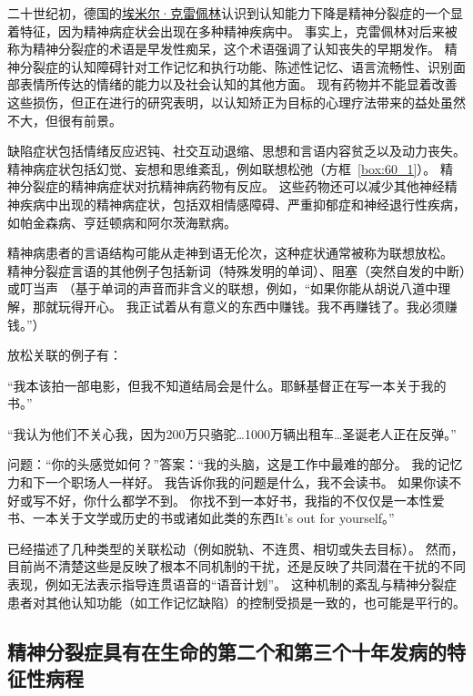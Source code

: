 二十世纪初，德国的\href{https://baike.baidu.com/item/%E5%9F%83%E7%B1%B3%E5%B0%94%C2%B7%E5%85%8B%E9%9B%B7%E4%BD%A9%E6%9E%97/6486796}{埃米尔·克雷佩林}认识到认知能力下降是精神分裂症的一个显着特征，因为精神病症状会出现在多种精神疾病中。
事实上，克雷佩林对后来被称为精神分裂症的术语是早发性痴呆，这个术语强调了认知丧失的早期发作。
精神分裂症的认知障碍针对工作记忆和执行功能、陈述性记忆、语言流畅性、识别面部表情所传达的情绪的能力以及社会认知的其他方面。
现有药物并不能显着改善这些损伤，但正在进行的研究表明，以认知矫正为目标的心理疗法带来的益处虽然不大，但很有前景。


缺陷症状包括情绪反应迟钝、社交互动退缩、思想和言语内容贫乏以及动力丧失。
精神病症状包括幻觉、妄想和思维紊乱，例如联想松弛（方框~\ref{box:60_1}）。
精神分裂症的精神病症状对抗精神病药物有反应。
这些药物还可以减少其他神经精神疾病中出现的精神病症状，包括双相情感障碍、严重抑郁症和神经退行性疾病，如帕金森病、亨廷顿病和阿尔茨海默病。


\begin{proposition}[思维障碍] \label{box:60_1}
	
	\quad \quad 精神病患者的言语结构可能从走神到语无伦次，这种症状通常被称为联想放松。
	精神分裂症言语的其他例子包括新词（特殊发明的单词）、阻塞（突然自发的中断）或叮当声
	（基于单词的声音而非含义的联想，例如，“如果你能从胡说八道中理解，那就玩得开心。
	我正试着从有意义的东西中赚钱。我不再赚钱了。我必须赚钱。”）
	
	放松关联的例子有：
	
	“我本该拍一部电影，但我不知道结局会是什么。耶稣基督正在写一本关于我的书。”
	
	“我认为他们不关心我，因为200万只骆驼…1000万辆出租车…圣诞老人正在反弹。”
	
	问题：“你的头感觉如何？”答案：“我的头脑，这是工作中最难的部分。
	我的记忆力和下一个职场人一样好。
	我告诉你我的问题是什么，我不会读书。
	如果你读不好或写不好，你什么都学不到。
	你找不到一本好书，我指的不仅仅是一本性爱书、一本关于文学或历史的书或诸如此类的东西It’s out for yourself。”
	
	已经描述了几种类型的关联松动（例如脱轨、不连贯、相切或失去目标）。
	然而，目前尚不清楚这些是反映了根本不同机制的干扰，还是反映了共同潜在干扰的不同表现，例如无法表示指导连贯语音的“语音计划”。
	这种机制的紊乱与精神分裂症患者对其他认知功能（如工作记忆缺陷）的控制受损是一致的，也可能是平行的。

\end{proposition}




\subsection{精神分裂症具有在生命的第二个和第三个十年发病的特征性病程}

